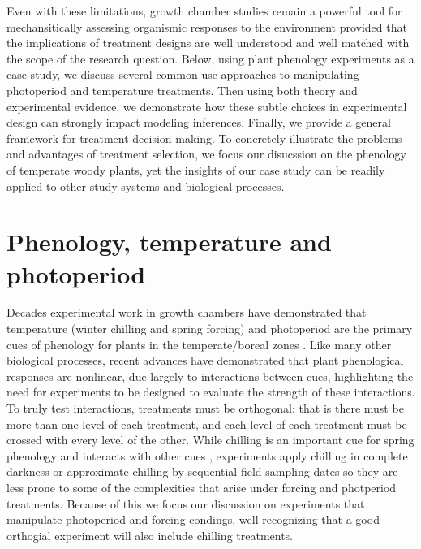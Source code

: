 \documentclass{article}[11pt]
\begin{document}
\noindent Even with these limitations, growth chamber studies remain a powerful tool for mechansitically assessing organismic responses to the environment provided that the implications of  treatment designs are well understood and well matched with the scope of the research question. Below, using plant phenology experiments as a case study, we discuss several common-use approaches to manipulating photoperiod and temperature treatments. Then using both theory and experimental evidence, we demonstrate how these subtle choices in experimental design can strongly impact modeling inferences. Finally, we provide a general framework for treatment decision making. To concretely illustrate the problems and advantages of treatment selection, we focus our disucssion on the phenology of temperate woody plants, yet the insights of our case study can be readily applied to other study systems and biological processes.\\ 

\section*{Phenology, temperature and photoperiod}
\noindent Decades experimental work in growth chambers have demonstrated that temperature (winter chilling and spring forcing) and photoperiod are the primary cues of phenology for plants in the temperate/boreal zones \citep{}. Like many other biological processes, recent advances have demonstrated that plant phenological responses are nonlinear, due largely to interactions between cues\citep{Flynn2018,Laube2014}, highlighting the need for experiments to be designed to evaluate the strength of these interactions. To truly test interactions, treatments must be orthogonal: that is there must be more than one level of each treatment, and each level of each treatment must be crossed with every level of the other. While chilling is an important cue for spring phenology\citep{Ettinger2020} and interacts with other cues\citep{Flynn2018} , experiments apply chilling in complete darkness or approximate chilling by sequential field sampling dates so they are less prone to some of the complexities that arise under forcing and photperiod treatments. Because of this we focus our discussion on experiments that manipulate photoperiod and forcing condings, well recognizing that a good orthogial experiment will also include chilling treatments. \\
\end{document}
